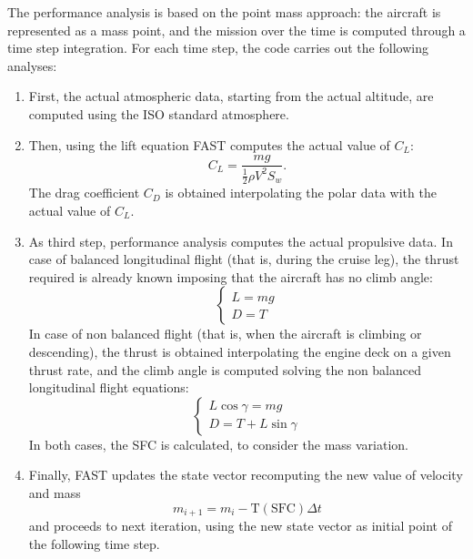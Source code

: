 The performance analysis is based on the point mass approach: the aircraft is represented as a mass point, and the mission over the time is computed through a time step integration. 
For each time step, the code carries out the following analyses:
\begin{enumerate}
	\item First, the actual atmospheric data, starting from the actual altitude, are computed using the ISO standard atmosphere.
	
	\item Then, using the lift equation FAST computes the actual value of $C_L$:
	\begin{equation}
	\label{eq:lift_equation}
	C_L = \frac{mg}{\frac{1}{2}\rho V^2 S_w}.
	\end{equation}
	The drag coefficient $C_D$ is obtained interpolating the polar data with the actual value of $C_L$.
	
	\item As third step, performance analysis computes the actual propulsive data. 
	In case of balanced longitudinal flight (that is, during the cruise leg), the thrust required is already known imposing that the aircraft has no climb angle: 
	\begin{equation}
	\label{eq:balanced_flight}
	\left\{\begin{array}{l}
	L = mg \\
	D = T
	\end{array}\right.
	\end{equation} 
	In case of non balanced flight (that is, when the aircraft is climbing or descending), the thrust is obtained interpolating the engine deck on a given thrust rate, and the climb angle is computed solving the non balanced longitudinal flight equations:
	\begin{equation}	
	\label{eq:non_balanced_flight}
	\left\{\begin{array}{l}
	L\cos\gamma = mg \\
	D = T + L\sin\gamma	
	\end{array}\right.	
	\end{equation}
	In both cases, the SFC is calculated, to consider the mass variation.
	
	\item Finally, FAST updates the state vector recomputing the new value of velocity and mass
	\begin{equation}
	\label{eq:mass_perfo_update}
	m_{i+1} =  m_i - \textrm{T}(\textrm{SFC})\Delta t
	\end{equation}
	and proceeds to next iteration, using the new state vector as initial point of the following time step.
\end{enumerate}

